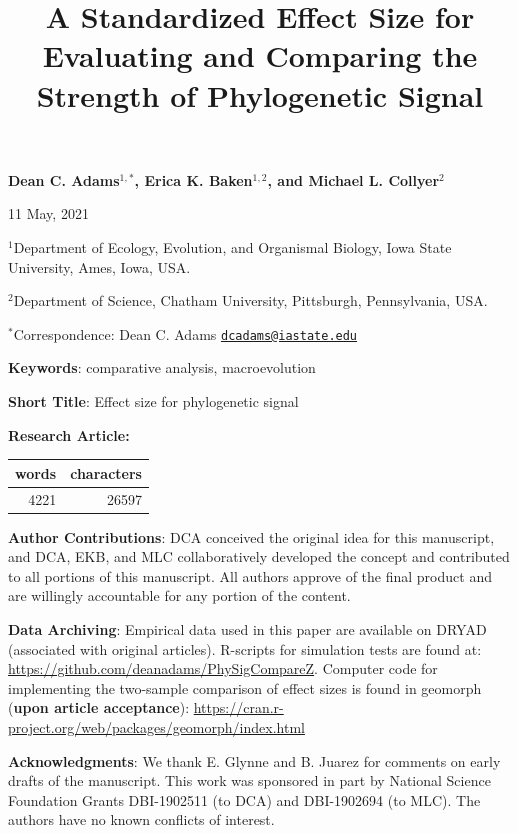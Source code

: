 \documentclass[
]{article}
\title{A Standardized Effect Size for Evaluating and Comparing the
Strength of Phylogenetic Signal}
\author{}
\date{\vspace{-2.5em}}
\begin{document}
\maketitle

\begin{center}
\textbf{Dean C. Adams$^{1,*}$, Erica K. Baken$^{1,2}$, and Michael L. Collyer$^2$}
\end{center}

\begin{center}11 May, 2021\end{center}

\(^{1}\)Department of Ecology, Evolution, and Organismal Biology, Iowa
State University, Ames, Iowa, USA.

\(^{2}\)Department of Science, Chatham University, Pittsburgh,
Pennsylvania, USA.

\(^{*}\)Correspondence: Dean C. Adams
\href{mailto:dcadams@iastate.edu}{\nolinkurl{dcadams@iastate.edu}}
\hfill\break

\textbf{Keywords}: comparative analysis, macroevolution \hfill\break

\textbf{Short Title}: Effect size for phylogenetic signal \hfill\break

\textbf{Research Article:}

\begin{longtable}[]{@{}rr@{}}
\toprule
words & characters \\
\midrule
\endhead
4221 & 26597 \\
\bottomrule
\end{longtable}

\textbf{Author Contributions}: DCA conceived the original idea for this
manuscript, and DCA, EKB, and MLC collaboratively developed the concept
and contributed to all portions of this manuscript. All authors approve
of the final product and are willingly accountable for any portion of
the content.\hfill\break

\textbf{Data Archiving}: Empirical data used in this paper are available
on DRYAD (associated with original articles). R-scripts for simulation
tests are found at: \url{https://github.com/deanadams/PhySigCompareZ}.
Computer code for implementing the two-sample comparison of effect sizes
is found in geomorph (\textbf{upon article acceptance}):
\url{https://cran.r-project.org/web/packages/geomorph/index.html}
\hfill\break

\textbf{Acknowledgments}: We thank E. Glynne and B. Juarez for comments
on early drafts of the manuscript. This work was sponsored in part by
National Science Foundation Grants DBI-1902511 (to DCA) and DBI-1902694
(to MLC). The authors have no known conflicts of interest.
\end{document}
